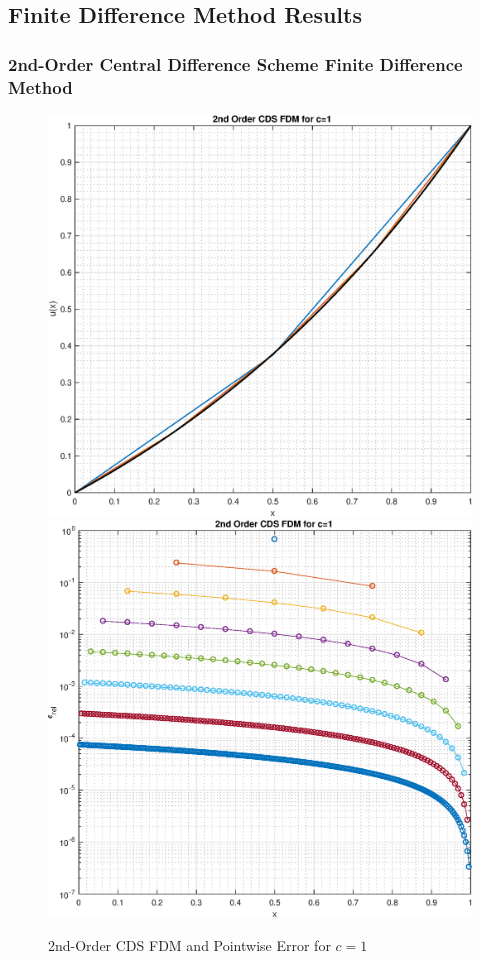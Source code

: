 \documentclass[10pt, reqno]{article}		%
\numberwithin{equation}{section}
\begin{document}
\newpage

\subsection{Finite Difference Method Results}

\subsubsection{2nd-Order Central Difference Scheme Finite Difference Method}

\begin{figure}[H]
	\begin{center}
		\includegraphics[width = 0.49\linewidth]{solution_2nd_order_cds_c_1}
		\includegraphics[width = 0.49\linewidth]{pointwise_error_2nd_order_cds_c_1}
		\caption{2nd-Order CDS FDM and Pointwise Error for $c = 1$}
	\end{center}
\end{figure}
\end{document}

